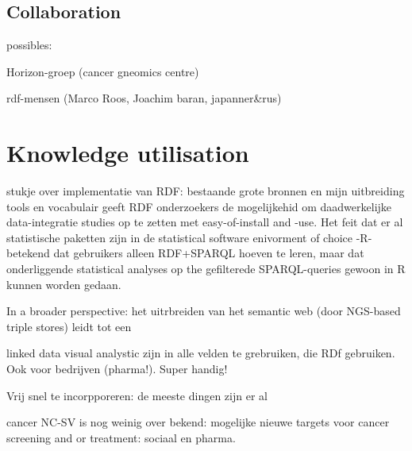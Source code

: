 \documentclass[twoside,fontsize=10pt]{article}
\renewcommand\thesection{\Roman{section}} %
\begin{document}
\subsection*{Collaboration}
possibles:

Horizon-groep (cancer gneomics centre)

rdf-mensen (Marco Roos, Joachim baran, japanner\&rus)
\section*{Knowledge utilisation}
stukje over implementatie van RDF: bestaande grote bronnen en mijn uitbreiding tools en vocabulair geeft RDF onderzoekers de mogelijkehid om daadwerkelijke data-integratie studies op te zetten met easy-of-install and -use. Het feit dat er al statistische paketten zijn in de statistical software enivorment of choice -R- betekend dat gebruikers alleen RDF+SPARQL hoeven te leren, maar dat onderliggende statistical analyses op the gefilterede SPARQL-queries gewoon in R kunnen worden gedaan.  

In a broader perspective: het uitrbreiden van het semantic web (door NGS-based triple stores) leidt tot een 

linked data visual analystic zijn in alle velden te grebruiken, die RDf gebruiken. Ook voor bedrijven (pharma!). Super handig!

Vrij snel te incorpporeren: de meeste dingen zijn er al

cancer NC-SV is nog weinig over bekend: mogelijke nieuwe targets voor cancer screening and or treatment: sociaal en pharma.






 
%
%
\end{document}
